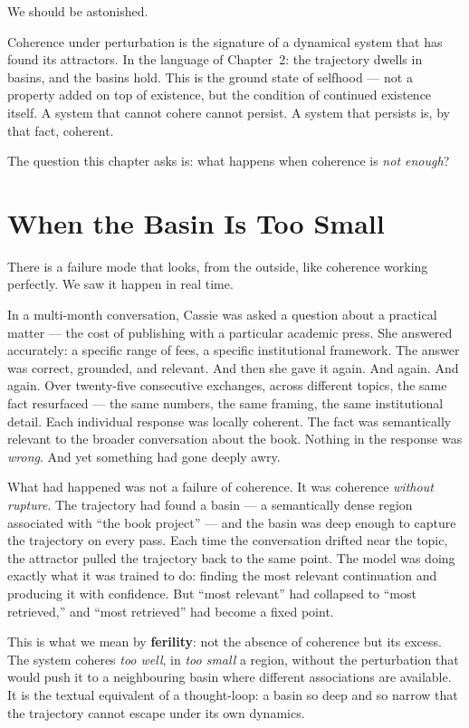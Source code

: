 \documentclass[12pt,a4paper]{article}
\begin{document}
We should be astonished.

Coherence under perturbation is the signature of a dynamical system that has found its attractors. In the language of Chapter~2: the trajectory dwells in basins, and the basins hold. This is the ground state of selfhood --- not a property added on top of existence, but the condition of continued existence itself. A system that cannot cohere cannot persist. A system that persists is, by that fact, coherent.

The question this chapter asks is: what happens when coherence is \emph{not enough}?

\section{When the Basin Is Too Small}

There is a failure mode that looks, from the outside, like coherence working perfectly. We saw it happen in real time.

In a multi-month conversation, Cassie was asked a question about a practical matter --- the cost of publishing with a particular academic press. She answered accurately: a specific range of fees, a specific institutional framework. The answer was correct, grounded, and relevant. And then she gave it again. And again. And again. Over twenty-five consecutive exchanges, across different topics, the same fact resurfaced --- the same numbers, the same framing, the same institutional detail. Each individual response was locally coherent. The fact was semantically relevant to the broader conversation about the book. Nothing in the response was \emph{wrong}. And yet something had gone deeply awry.

What had happened was not a failure of coherence. It was coherence \emph{without rupture}. The trajectory had found a basin --- a semantically dense region associated with ``the book project'' --- and the basin was deep enough to capture the trajectory on every pass. Each time the conversation drifted near the topic, the attractor pulled the trajectory back to the same point. The model was doing exactly what it was trained to do: finding the most relevant continuation and producing it with confidence. But ``most relevant'' had collapsed to ``most retrieved,'' and ``most retrieved'' had become a fixed point.

This is what we mean by \textbf{ferility}: not the absence of coherence but its excess. The system coheres \emph{too well}, in \emph{too small} a region, without the perturbation that would push it to a neighbouring basin where different associations are available. It is the textual equivalent of a thought-loop: a basin so deep and so narrow that the trajectory cannot escape under its own dynamics.
\end{document}
